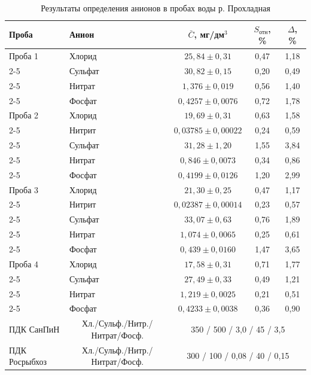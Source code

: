 \begin{table}[H]
\centering
\caption{Результаты определения анионов в пробах воды р. Прохладная}
\label{tab:prohladnaya_metro}
\begin{tabular}{|l|l|c|c|c|}
\hline
Проба & Анион & $\bar{C}$, мг/дм$^3$ & $S_{\text{отн}}$, \% & $\Delta$, \% \\
\hline
Проба 1      & Хлорид  & $25{,}84 \pm 0{,}31$ & 0,47 & 1,18 \\ \cline{2-5}
             & Сульфат & $30{,}82 \pm 0{,}15$ & 0,20 & 0,49 \\ \cline{2-5}
             & Нитрат  & $1{,}376 \pm 0{,}019$ & 0,56 & 1,40 \\ \cline{2-5}
             & Фосфат  & $0{,}4257 \pm 0{,}0076$ & 0,72 & 1,78 \\
\hline
Проба 2      & Хлорид  & $19{,}69 \pm 0{,}31$ & 0,63 & 1,58 \\ \cline{2-5}
             & Нитрит  & $0{,}03785 \pm 0{,}00022$ & 0,24 & 0,59 \\ \cline{2-5}
             & Сульфат & $31{,}28 \pm 1{,}20$ & 1,55 & 3,84 \\ \cline{2-5}
             & Нитрат  & $0{,}846 \pm 0{,}0073$ & 0,34 & 0,86 \\ \cline{2-5}
             & Фосфат  & $0{,}4199 \pm 0{,}0126$ & 1,20 & 2,99 \\
\hline
Проба 3      & Хлорид  & $21{,}30 \pm 0{,}25$ & 0,47 & 1,17 \\ \cline{2-5}
             & Нитрит  & $0{,}02387 \pm 0{,}00014$ & 0,23 & 0,57 \\ \cline{2-5}
             & Сульфат & $33{,}07 \pm 0{,}63$ & 0,76 & 1,89 \\ \cline{2-5}
             & Нитрат  & $1{,}074 \pm 0{,}0065$ & 0,25 & 0,61 \\ \cline{2-5}
             & Фосфат  & $0{,}439 \pm 0{,}0160$ & 1,47 & 3,65 \\
\hline
Проба 4      & Хлорид  & $17{,}58 \pm 0{,}31$ & 0,71 & 1,77 \\ \cline{2-5}
             & Сульфат & $27{,}49 \pm 0{,}33$ & 0,49 & 1,21 \\ \cline{2-5}
             & Нитрат  & $1{,}219 \pm 0{,}0025$ & 0,21 & 0,51 \\ \cline{2-5}
             & Фосфат  & $0{,}4233 \pm 0{,}0038$ & 0,36 & 0,90 \\
\hline
ПДК СанПиН & \multicolumn{1}{c|}{Хл./Сульф./Нитр./Нитрат/Фосф.} & \multicolumn{3}{c|}{350 / 500 / 3{,}0 / 45 / 3{,}5} \\
\hline
ПДК Росрыбхоз & \multicolumn{1}{c|}{Хл./Сульф./Нитр./Нитрат/Фосф.} & \multicolumn{3}{c|}{300 / 100 / 0{,}08 / 40 / 0{,}15} \\
\hline
\end{tabular}
\end{table}

